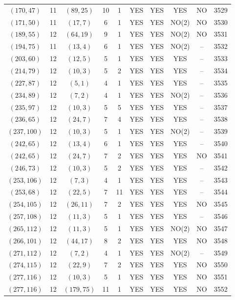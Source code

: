 \begin{longtable}{|c|c|c|c|c|c|c|c|c|c|}
$(170, 47)$ & 11 & $(89, 25)$ & 10 & 1 & YES & YES & YES & NO & 3529\\
$(171, 50)$ & 11 & $(17, 7)$ & 6 & 1 & YES & YES & NO(2) & NO & 3530\\
$(189, 55)$ & 12 & $(64, 19)$ & 9 & 1 & YES & YES & NO(2) & NO & 3531\\
$(194, 75)$ & 11 & $(13, 4)$ & 6 & 1 & YES & YES & NO(2) & -- & 3532\\
$(203, 60)$ & 12 & $(12, 5)$ & 5 & 1 & YES & YES & YES & -- & 3533\\
$(214, 79)$ & 12 & $(10, 3)$ & 5 & 2 & YES & YES & YES & -- & 3534\\
$(227, 87)$ & 12 & $(5, 1)$ & 4 & 1 & YES & YES & YES & -- & 3535\\
$(234, 89)$ & 12 & $(7, 2)$ & 4 & 1 & YES & YES & NO(2) & -- & 3536\\
$(235, 97)$ & 12 & $(10, 3)$ & 5 & 5 & YES & YES & YES & -- & 3537\\
$(236, 65)$ & 12 & $(24, 7)$ & 7 & 4 & YES & YES & YES & -- & 3538\\
$(237, 100)$ & 12 & $(10, 3)$ & 5 & 1 & YES & YES & NO(2) & -- & 3539\\
$(242, 65)$ & 12 & $(13, 4)$ & 6 & 1 & YES & YES & YES & -- & 3540\\
$(242, 65)$ & 12 & $(24, 7)$ & 7 & 2 & YES & YES & YES & NO & 3541\\
$(246, 73)$ & 12 & $(10, 3)$ & 5 & 2 & YES & YES & YES & -- & 3542\\
$(253, 106)$ & 12 & $(7, 3)$ & 4 & 1 & YES & YES & YES & -- & 3543\\
$(253, 68)$ & 12 & $(22, 5)$ & 7 & 11 & YES & YES & YES & -- & 3544\\
$(254, 105)$ & 12 & $(26, 11)$ & 7 & 2 & YES & YES & YES & NO & 3545\\
$(257, 108)$ & 12 & $(11, 3)$ & 5 & 1 & YES & YES & YES & -- & 3546\\
$(265, 112)$ & 12 & $(11, 3)$ & 5 & 1 & YES & YES & NO(2) & NO & 3547\\
$(266, 101)$ & 12 & $(44, 17)$ & 8 & 2 & YES & YES & YES & NO & 3548\\
$(271, 112)$ & 12 & $(7, 2)$ & 4 & 1 & YES & YES & NO(2) & -- & 3549\\
$(274, 115)$ & 12 & $(22, 9)$ & 7 & 2 & YES & YES & YES & NO & 3550\\
$(277, 116)$ & 12 & $(10, 3)$ & 5 & 1 & YES & YES & YES & NO & 3551\\
$(277, 116)$ & 12 & $(179, 75)$ & 11 & 1 & YES & YES & YES & NO & 3552\\

\end{longtable}
